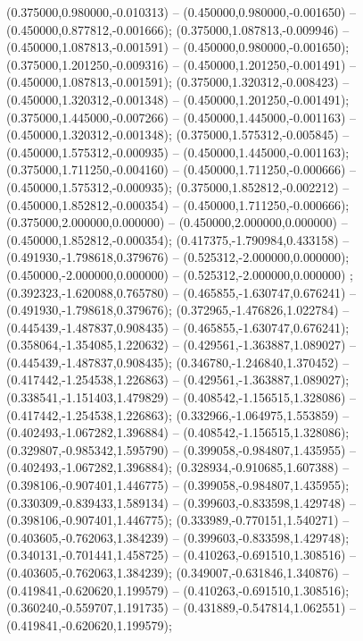  (0.375000,0.980000,-0.010313) -- (0.450000,0.980000,-0.001650) -- (0.450000,0.877812,-0.001666);
 (0.375000,1.087813,-0.009946) -- (0.450000,1.087813,-0.001591) -- (0.450000,0.980000,-0.001650);
 (0.375000,1.201250,-0.009316) -- (0.450000,1.201250,-0.001491) -- (0.450000,1.087813,-0.001591);
 (0.375000,1.320312,-0.008423) -- (0.450000,1.320312,-0.001348) -- (0.450000,1.201250,-0.001491);
 (0.375000,1.445000,-0.007266) -- (0.450000,1.445000,-0.001163) -- (0.450000,1.320312,-0.001348);
 (0.375000,1.575312,-0.005845) -- (0.450000,1.575312,-0.000935) -- (0.450000,1.445000,-0.001163);
 (0.375000,1.711250,-0.004160) -- (0.450000,1.711250,-0.000666) -- (0.450000,1.575312,-0.000935);
 (0.375000,1.852812,-0.002212) -- (0.450000,1.852812,-0.000354) -- (0.450000,1.711250,-0.000666);
 (0.375000,2.000000,0.000000) -- (0.450000,2.000000,0.000000) -- (0.450000,1.852812,-0.000354);
 (0.417375,-1.790984,0.433158) -- (0.491930,-1.798618,0.379676) -- (0.525312,-2.000000,0.000000);
 (0.450000,-2.000000,0.000000) -- (0.525312,-2.000000,0.000000) ;
 (0.392323,-1.620088,0.765780) -- (0.465855,-1.630747,0.676241) -- (0.491930,-1.798618,0.379676);
 (0.372965,-1.476826,1.022784) -- (0.445439,-1.487837,0.908435) -- (0.465855,-1.630747,0.676241);
 (0.358064,-1.354085,1.220632) -- (0.429561,-1.363887,1.089027) -- (0.445439,-1.487837,0.908435);
 (0.346780,-1.246840,1.370452) -- (0.417442,-1.254538,1.226863) -- (0.429561,-1.363887,1.089027);
 (0.338541,-1.151403,1.479829) -- (0.408542,-1.156515,1.328086) -- (0.417442,-1.254538,1.226863);
 (0.332966,-1.064975,1.553859) -- (0.402493,-1.067282,1.396884) -- (0.408542,-1.156515,1.328086);
 (0.329807,-0.985342,1.595790) -- (0.399058,-0.984807,1.435955) -- (0.402493,-1.067282,1.396884);
 (0.328934,-0.910685,1.607388) -- (0.398106,-0.907401,1.446775) -- (0.399058,-0.984807,1.435955);
 (0.330309,-0.839433,1.589134) -- (0.399603,-0.833598,1.429748) -- (0.398106,-0.907401,1.446775);
 (0.333989,-0.770151,1.540271) -- (0.403605,-0.762063,1.384239) -- (0.399603,-0.833598,1.429748);
 (0.340131,-0.701441,1.458725) -- (0.410263,-0.691510,1.308516) -- (0.403605,-0.762063,1.384239);
 (0.349007,-0.631846,1.340876) -- (0.419841,-0.620620,1.199579) -- (0.410263,-0.691510,1.308516);
 (0.360240,-0.559707,1.191735) -- (0.431889,-0.547814,1.062551) -- (0.419841,-0.620620,1.199579);
